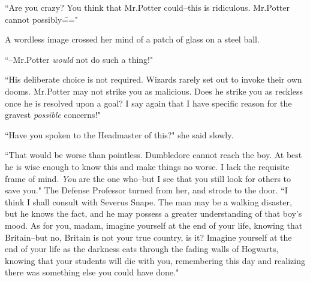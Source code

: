 ``Are you crazy? You think that Mr.\?Potter could\---this is ridiculous. Mr.\?Potter cannot possibly\==="

A wordless image crossed her mind of a patch of glass on a steel ball.

``\---Mr.\?Potter \emph{would} not do such a thing!"

``His deliberate choice is not required. Wizards rarely set out to invoke their own dooms. Mr.\?Potter may not strike you as malicious. Does he strike you as reckless once he is resolved upon a goal? I say again that I have specific reason for the gravest \emph{possible} concerns!"

``Have you spoken to the Headmaster of this?" she said slowly.

``That would be worse than pointless. Dumbledore cannot reach the boy. At best he is wise enough to know this and make things no worse. I lack the requisite frame of mind. \emph{You} are the one who\---but I see that you still look for others to save you." The Defense Professor turned from her, and strode to the door. ``I think I shall consult with Severus Snape. The man may be a walking disaster, but he knows the fact, and he may possess a greater understanding of that boy's mood. As for you, madam, imagine yourself at the end of your life, knowing that Britain\---but no, Britain is not your true country, is it? Imagine yourself at the end of your life as the darkness eats through the fading walls of Hogwarts, knowing that your students will die with you, remembering this day and realizing there was something else you could have done."

